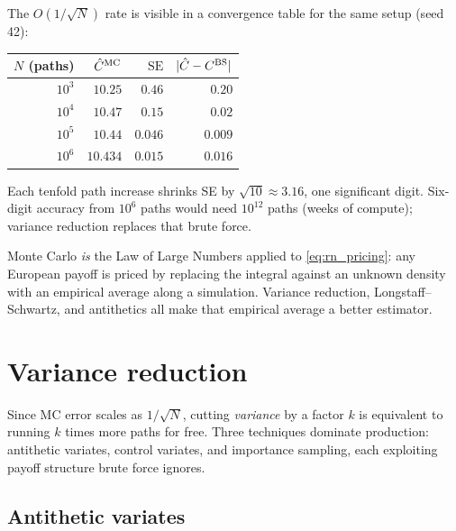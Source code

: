 The $O(1/\sqrt N)$ rate is visible in a convergence table for the
same setup (seed 42):

\begin{center}
\small
\renewcommand{\arraystretch}{1.15}
\begin{tabular}{r|rrr}
\toprule
$N$ (paths) & $\hat{C}^{\mathrm{MC}}$ & $\mathrm{SE}$ & $|\hat{C}-C^{\mathrm{BS}}|$ \\
\midrule
$10^3$  & $10.25$ & $0.46$ & $0.20$ \\
$10^4$  & $10.47$ & $0.15$ & $0.02$ \\
$10^5$  & $10.44$ & $0.046$ & $0.009$ \\
$10^6$  & $10.434$ & $0.015$ & $0.016$ \\
\bottomrule
\end{tabular}
\end{center}

Each tenfold path increase shrinks SE by $\sqrt{10} \approx 3.16$,
one significant digit.  Six-digit accuracy from $10^6$ paths would
need $10^{12}$ paths (weeks of compute); variance reduction replaces
that brute force.

\begin{intuitionbox}
Monte Carlo \emph{is} the Law of Large Numbers applied to
\eqref{eq:rn_pricing}: any European payoff is priced by replacing the
integral against an unknown density with an empirical average along a
simulation.  Variance reduction, Longstaff--Schwartz, and antithetics
all make that empirical average a better estimator.
\end{intuitionbox}


\section{Variance reduction}
\label{sec:variance_reduction}

Since MC error scales as $1/\sqrt N$, cutting \emph{variance} by a
factor $k$ is equivalent to running $k$ times more paths for free.
Three techniques dominate production: antithetic variates, control
variates, and importance sampling, each exploiting payoff structure
brute force ignores.

\subsection{Antithetic variates}

